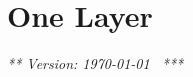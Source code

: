\chapter{One Layer}
\label{chap:singleLayer}

{\em *** Version: \today~ ***}


%
%
%
%
%
%
%
%
%
%
%
%
%




